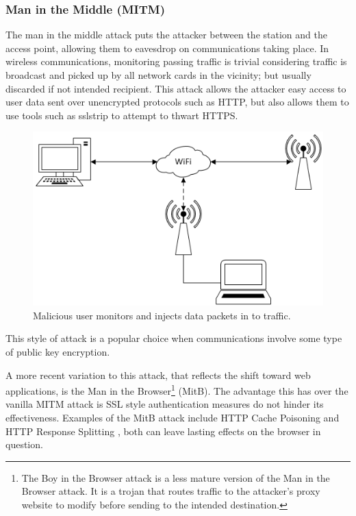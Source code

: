 \subsubsection{Man in the Middle (MITM)}
The man in the middle attack puts the attacker between the station and the access point, allowing them to eavesdrop on communications taking place. In wireless communications, monitoring passing traffic is trivial considering traffic is broadcast and picked up by all network cards in the vicinity; but usually discarded if not intended recipient. This attack allows the attacker easy access to user data sent over unencrypted protocols such as HTTP, but also allows them to use tools such as sslstrip \cite{research:ssl_strip} to attempt to thwart HTTPS.

\begin{figure}[h!]
\includegraphics[width=\linewidth]{research/figures/mitm.png}
\caption{Malicious user monitors and injects data packets in to traffic.}
\end{figure}

This style of attack is a popular choice when communications involve some type of public key encryption. 

A more recent variation to this attack, that reflects the shift toward web applications, is the Man in the Browser\footnote{The Boy in the Browser attack \cite{research:bitb} is a less mature version of the Man in the Browser attack. It is a trojan that routes traffic to the attacker’s proxy website to modify before sending to the intended destination.} (MitB). The advantage this has over the vanilla MITM attack is SSL style authentication measures do not hinder its effectiveness. Examples of the MitB attack include HTTP Cache Poisoning \cite{research:cache_poisoning} and HTTP Response Splitting \cite{research:response_splitting}, both can leave lasting effects on the browser in question.

